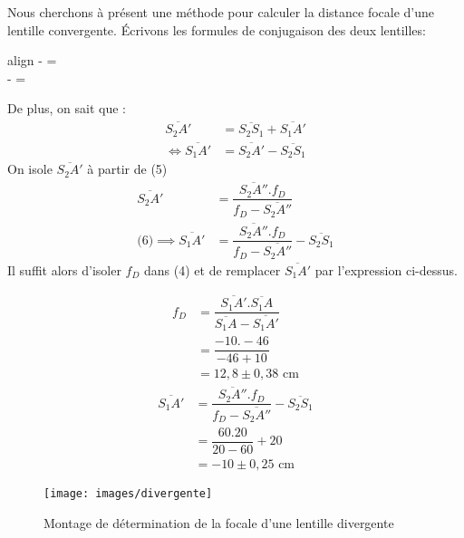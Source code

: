 \documentclass[12pt,a4paper]{article}
\begin{document}
	Nous cherchons à présent une méthode pour calculer la distance focale d'une lentille convergente. %
	Écrivons les formules de conjugaison des deux lentilles:
	\begin{empheq}[left=\empheqlbrace]{align}
	 - =  \\
	 - =  
	\end{empheq}
	De plus, on sait que :
	\begin{align}
	\overline{S_2A'} &= \overline{S_2S_1}+\overline{S_1A'} \nonumber \\
	\iff \overline{S_1A'}&=\overline{S_2A'}-\overline{S_2S_1} 
	\end{align}
	On isole $\overline{S_2A'}$ à partir de (5)\\
	\begin{align*}
	\overline{S_2A'}&=\dfrac{\overline{S_2A''}.f_D}{f_D-\overline{S_2A''}}\\[1em]
	\text{(6)}\implies \overline{S_1A'}&=\dfrac{\overline{S_2A''}.f_D}{f_D-\overline{S_2A''}}-\overline{S_2S_1}
	\end{align*}
	Il suffit alors d'isoler $f_D$ dans (4) et de remplacer $\overline{S_1A'}$ par l'expression ci-dessus.
	\begin{multicols}{2}
		\setlength\columnseprule{0.4pt}
		\begingroup
		\addtolength{\jot}{1em}
		\begin{align*}
		f_D&=\dfrac{\overline{S_1A'}.\overline{S_1A}}{\overline{S_1A}-\overline{S_1A'}}\\
		&=\dfrac{-10.-46}{-46+10}\\
		&=12,8\pm0,38\text{ cm}
		\end{align*}
		\vfill
		\columnbreak
		\begin{align*}
		\overline{S_1A'}&=\dfrac{\overline{S_2A''}.f_D}{f_D-\overline{S_2A''}}-\overline{S_2S_1}\\
		&=\dfrac{60.20}{20-60}+20\\
		&=-10\pm0,25\text{ cm}
		\end{align*}
		\endgroup
	\end{multicols}
	
	\begin{figure}[h]
		\begin{bigcenter}
			\texttt{[image: images/divergente]}
			\caption[]{Montage de détermination de la focale d'une lentille divergente}
			\label{fig:divergente}
		\end{bigcenter}
	\end{figure}
	
\end{document}
